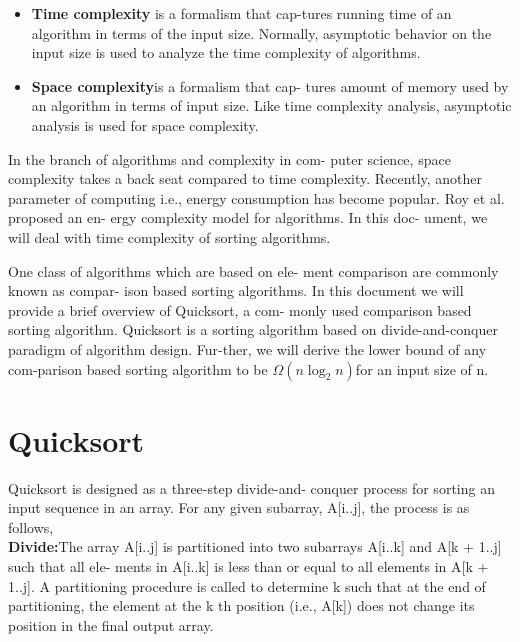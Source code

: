 \documentclass[a4paper, 10pt,twocolumn]{article}
\begin{document}
\begin{itemize}
    \item \textbf{Time complexity} is a formalism that cap-tures running time of an algorithm in terms of the input size. Normally, asymptotic behavior on the input size is used to analyze the time complexity of algorithms.
    \item \textbf{Space complexity}is a formalism that cap-
tures amount of memory used by an algorithm
in terms of input size. Like time complexity
analysis, asymptotic analysis is used for space
complexity.
\end{itemize}
In the branch of algorithms and complexity in com-
puter science, space complexity takes a back seat
compared to time complexity. Recently, another
parameter of computing i.e., energy consumption
has become popular. Roy et al.\cite{four} proposed an en-
ergy complexity model for algorithms. In this doc-
ument, we will deal with time complexity of sorting
algorithms.

One class of algorithms which are based on ele-
ment comparison are commonly known as compar-
ison based sorting algorithms. In this document we
will provide a brief overview of Quicksort, a com-
monly
used comparison based sorting algorithm\cite{two}.
Quicksort\hspace{.1mm} is a sorting algorithm based on divide-and-conquer
paradigm of algorithm design. Fur-ther,
we
will
derive the lower bound of any com-parison based sorting algorithm to be $\Omega( n \log_2 n)$for
an input size of n.

\section{Quicksort}
Quicksort is designed as a three-step divide-and-
conquer process for sorting an input sequence in
an array\cite{first}. For any given subarray, A[i..j], the
process is as follows,\\
\textbf{Divide:}The array A[i..j] is partitioned into two
subarrays A[i..k] and A[k + 1..j] such that all ele-
ments in A[i..k] is less than or equal to all elements
in A[k + 1..j]. A partitioning procedure is called to
determine k such that at the end of partitioning,
the element at the k th position (i.e., A[k]) does not
change its position in the final output array.



\end{document}
